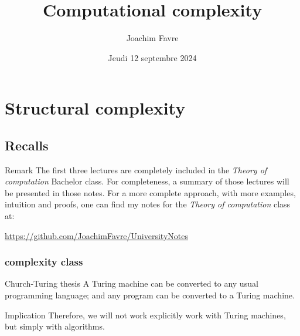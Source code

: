 \documentclass[a4paper]{article}
\title{Computational complexity}
\author{Joachim Favre}
\date{Jeudi 12 septembre 2024}
\begin{document}
\maketitle


\section{Structural complexity}

\subsection{Recalls}

\begin{parag}{Remark}
    The first three lectures are completely included in the \textit{Theory of computation} Bachelor class. For completeness, a summary of those lectures will be presented in those notes. For a more complete approach, with more examples, intuition and proofs, one can find my notes for the \textit{Theory of computation} class at:
    \begin{center}
        \url{https://github.com/JoachimFavre/UniversityNotes}
    \end{center}
\end{parag}

\subsubsection{ complexity class}

\begin{parag}{Church-Turing thesis}
    A Turing machine can be converted to any usual programming language; and any program can be converted to a Turing machine.

    \begin{subparag}{Implication}
        Therefore, we will not work explicitly work with Turing machines, but simply with algorithms.
    \end{subparag}
\end{parag}
\end{document}
